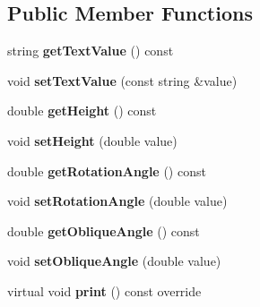 \subsection*{Public Member Functions}
\begin{DoxyCompactItemize}
\item 
string {\bfseries get\+Text\+Value} () const \hypertarget{class_c_a_d_text_aa23f4117f7b42683e8ab0e1d8aa1bec9}{}\label{class_c_a_d_text_aa23f4117f7b42683e8ab0e1d8aa1bec9}

\item 
void {\bfseries set\+Text\+Value} (const string \&value)\hypertarget{class_c_a_d_text_a09043f7cfd6b20f03c01f5805a90377f}{}\label{class_c_a_d_text_a09043f7cfd6b20f03c01f5805a90377f}

\item 
double {\bfseries get\+Height} () const \hypertarget{class_c_a_d_text_a9e14406eca5833295c9bee2d8d02d678}{}\label{class_c_a_d_text_a9e14406eca5833295c9bee2d8d02d678}

\item 
void {\bfseries set\+Height} (double value)\hypertarget{class_c_a_d_text_aeb577188997168fcad594abcb0e19640}{}\label{class_c_a_d_text_aeb577188997168fcad594abcb0e19640}

\item 
double {\bfseries get\+Rotation\+Angle} () const \hypertarget{class_c_a_d_text_a15e7c20fbee34e1fbf7f0a43c68e010f}{}\label{class_c_a_d_text_a15e7c20fbee34e1fbf7f0a43c68e010f}

\item 
void {\bfseries set\+Rotation\+Angle} (double value)\hypertarget{class_c_a_d_text_a989946acfe857923ff2bd0c6a1309d08}{}\label{class_c_a_d_text_a989946acfe857923ff2bd0c6a1309d08}

\item 
double {\bfseries get\+Oblique\+Angle} () const \hypertarget{class_c_a_d_text_a7aafb746aee2dc2504d9efab44d7524c}{}\label{class_c_a_d_text_a7aafb746aee2dc2504d9efab44d7524c}

\item 
void {\bfseries set\+Oblique\+Angle} (double value)\hypertarget{class_c_a_d_text_ac74b8f4815e2799f958dcf4dd02b666c}{}\label{class_c_a_d_text_ac74b8f4815e2799f958dcf4dd02b666c}

\item 
virtual void {\bfseries print} () const  override\hypertarget{class_c_a_d_text_a0399640e5be819d48fc1852d99f5f0d2}{}\label{class_c_a_d_text_a0399640e5be819d48fc1852d99f5f0d2}

\end{DoxyCompactItemize}
